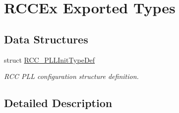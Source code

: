\hypertarget{group___r_c_c_ex___exported___types}{}\section{R\+C\+C\+Ex Exported Types}
\label{group___r_c_c_ex___exported___types}
\subsection*{Data Structures}
\begin{DoxyCompactItemize}
\item 
struct \hyperlink{struct_r_c_c___p_l_l_init_type_def}{R\+C\+C\+\_\+\+P\+L\+L\+Init\+Type\+Def}
\begin{DoxyCompactList}\small\item\em R\+CC P\+LL configuration structure definition. \end{DoxyCompactList}\end{DoxyCompactItemize}


\subsection{Detailed Description}

